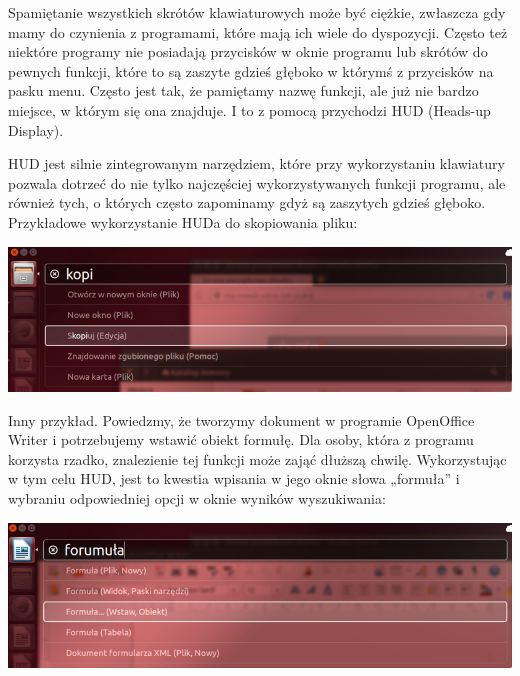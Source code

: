 Spamiętanie wszystkich skrótów klawiaturowych może być ciężkie, zwłaszcza gdy mamy do czynienia z programami, które mają ich wiele do dyspozycji. Często też niektóre programy nie posiadają przycisków w oknie programu lub skrótów do pewnych funkcji, które to są zaszyte gdzieś głęboko w którymś z przycisków na pasku menu. Często jest tak, że pamiętamy nazwę funkcji, ale już nie bardzo miejsce, w którym się ona znajduje. I to z pomocą przychodzi \textcolor{ubuntu_orange}{HUD} (Heads-up Display).

HUD jest silnie zintegrowanym narzędziem, które przy wykorzystaniu klawiatury pozwala dotrzeć do nie tylko najczęściej wykorzystywanych funkcji programu, ale również tych, o których często zapominamy gdyż są zaszytych gdzieś głęboko. Przykładowe wykorzystanie HUDa do skopiowania pliku:

\begin{center}
	\includegraphics[width=\linewidth]{images/unity_hud1.png}
\end{center}

Inny przykład. Powiedzmy, że tworzymy dokument w programie OpenOffice Writer i potrzebujemy wstawić obiekt formułę. Dla osoby, która z programu korzysta rzadko, znalezienie tej funkcji może zająć dłuższą chwilę. Wykorzystując w tym celu HUD, jest to kwestia wpisania w jego oknie słowa „formuła” i wybraniu odpowiedniej opcji w oknie wyników wyszukiwania:
\begin{center}
	\includegraphics[width=\linewidth]{images/unity_hud2.png}
\end{center}
